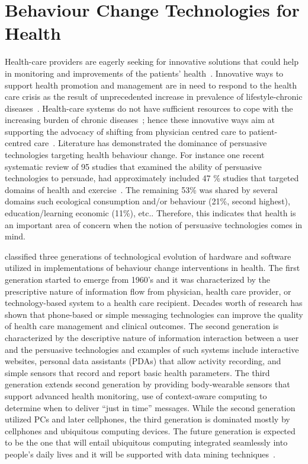 \section{Behaviour Change Technologies for Health}
Health-care providers are eagerly seeking for innovative solutions that could help in monitoring and improvements of the patients' health~\citep{higgins2016smartphone}. Innovative ways to support health promotion and management are in need to respond to the health care crisis as the result of unprecedented increase in prevalence of lifestyle-chronic diseases~\citep{arsand:mobile}. Health-care systems do not have sufficient resources to cope with the increasing burden of chronic diseases~\citep{quinn2008welldoc,arsand:mobile}; hence these innovative ways aim at supporting the advocacy of shifting from physician centred care to patient-centred care~\citep{higgins2016smartphone,korhonen2010personal}.  Literature has demonstrated the dominance of persuasive technologies targeting health behaviour change. For instance one recent systematic review of 95 studies that examined the ability of persuasive technologies to persuade, had approximately included 47 \% studies that  targeted domains of health and exercise~\citep{hamari2014persuasive}. The remaining 53\% was shared by several domains such ecological consumption and/or behaviour (21\%, second highest), education/learning economic (11\%), etc.. Therefore, this indicates that health is an important area of concern when the notion of persuasive technologies comes in mind.

\cite{chatterjee2009healthy} classified three generations  of technological evolution of hardware and software utilized in implementations of behaviour change interventions in health. The first generation started to emerge from 1960's and it was characterized by the prescriptive nature of information flow from physician, health care provider, or technology-based system to a health care recipient. Decades worth of research has shown that phone-based or simple messaging technologies can improve the quality of health care management and clinical outcomes. The second generation is characterized by the descriptive nature of information interaction between a user and the persuasive technologies and examples of such systems include interactive websites, personal data assistants (PDAs) that allow activity recording, and simple sensors that record and report basic health parameters. The third generation extends second generation by providing body-wearable sensors that support advanced health monitoring, use of context-aware computing to determine when to deliver “just in time” messages.  While the second generation utilized PCs and later cellphones, the third generation is dominated mostly by cellphones and ubiquitous computing devices. The future generation is expected to be the one that will entail ubiquitous computing integrated seamlessly into people's daily lives and it will be supported with data mining techniques~\citep{chatterjee2009healthy}.

